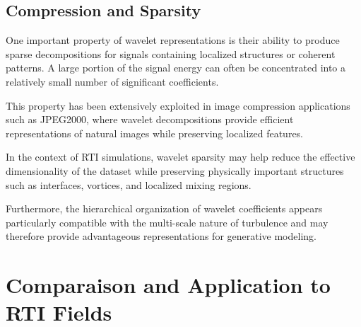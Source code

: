 
\subsection{Compression and Sparsity}

One important property of wavelet representations is their ability to produce sparse decompositions for signals containing localized structures or coherent patterns. A large portion of the signal energy can often be concentrated into a relatively small number of significant coefficients.

This property has been extensively exploited in image compression applications such as JPEG2000, where wavelet decompositions provide efficient representations of natural images while preserving localized features.

In the context of RTI simulations, wavelet sparsity may help reduce the effective dimensionality of the dataset while preserving physically important structures such as interfaces, vortices, and localized mixing regions.

Furthermore, the hierarchical organization of wavelet coefficients appears particularly compatible with the multi-scale nature of turbulence and may therefore provide advantageous representations for generative modeling.

\section{Comparaison and Application to RTI Fields}

